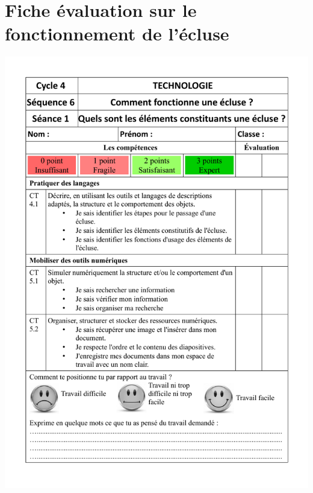 \section{Fiche évaluation sur le fonctionnement de l'écluse}\label{annexe:evaluation_fct_ecluse}
\includegraphics{./ressources/Fonctionnement_Ecluse_S1_4e_a5_1.pdf} 

